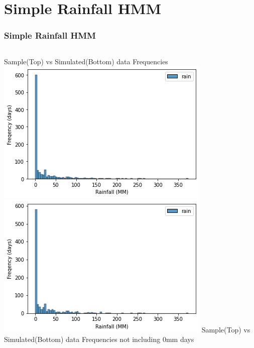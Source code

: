 \documentclass{beamer}
\begin{document}
    \section{Simple Rainfall HMM}
    \begin{frame}
        \frametitle{Simple Rainfall HMM}
        \begin{columns}
            Sample(Top) vs Simulated(Bottom) data Frequencies
            \includegraphics[width=0.8\linewidth]{HMM_Only/0_freq_data.png}
            \includegraphics[width=0.8\linewidth]{HMM_Only/0_freq_sim.png}
            Sample(Top) vs Simulated(Bottom) data Frequencies not including 0mm days
            

\end{columns}
\end{frame}
\end{document}
